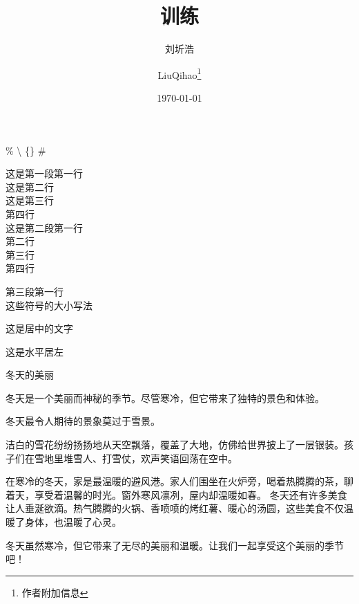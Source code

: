 \documentclass{article} %
\title{训练} %
\author{刘圻浩 \and LiuQihao\thanks{作者附加信息}} %
\date{\today} %
\begin{document}
\maketitle %

\% %
\textbackslash %
\{\} %
\# %

这是第一段第一行\\
这是第二行\\
这是第三行\\
第四行\\

这是第二段第一行\\ %
第二行\\
第三行\\
第四行\par %
第三段第一行\\
这些符号的大小\hspace{1em}写法\\ %
\begin{center} %
    这是居中的文字
\end{center}
\begin{flushleft}
    这是水平居左
\end{flushleft}\par
\begin{center}
冬天的美丽   
\end{center}\par
冬天是一个美丽而神秘的季节。尽管寒冷，但它带来了独特的景色和体验。
\begin{flushright}
冬天最令人期待的景象莫过于雪景。
\end{flushright}\par
洁白的雪花纷纷扬扬地从天空飘落，覆盖了大地，仿佛给世界披上了一层银装。孩子们在雪地里堆雪人、打雪仗，欢声笑语回荡在空中。\par
在寒冷的冬天，家是最温暖的避风港。家人们围坐在火炉旁，喝着热腾腾的茶，聊着天，享受着温馨的时光。窗外寒风凛冽，屋内却温暖如春。
冬天还有许多美食让人垂涎欲滴。热气腾腾的火锅、香喷喷的烤红薯、暖心的汤圆，这些美食不仅温暖了身体，也温暖了心灵。\par\noindent
冬天虽然寒冷，但它带来了无尽的美丽和温暖。让我们一起享受这个美丽的季节吧！
\end{document}
